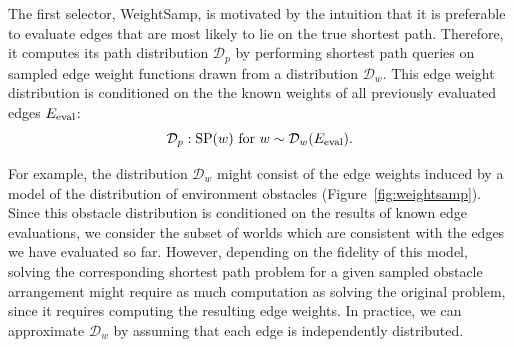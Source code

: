 \documentclass[nobib]{tufte-book}
\newcommand{\ms}[1]{\mbox{\scriptsize #1}}
\begin{document}
The first selector, WeightSamp,
is motivated by the intuition that it is preferable to evaluate edges
that are most likely to lie on the true shortest path.
Therefore,
it computes its path distribution $\mathcal{D}_p$
by performing shortest path queries
on sampled edge weight functions drawn from a distribution
$\mathcal{D}_w$.
This edge weight distribution is conditioned on the the known weights
of all previously evaluated edges $E_{\ms{eval}}$:
\begin{equation}
   \mathcal{D}_p : \mbox{SP}(w)
   \mbox{ for } w \sim \mathcal{D}_w(E_{\ms{eval}})
   \label{eqn:weightsamp}.
\end{equation}

For example,
the distribution $\mathcal{D}_w$ might consist of
the edge weights induced by a model of the distribution of
environment obstacles
(Figure~\ref{fig:weightsamp}).
Since this obstacle distribution is conditioned on the results
of known edge evaluations,
we consider the subset of worlds which are consistent
with the edges we have evaluated so far.
However,
depending on the fidelity of this model,
solving the corresponding shortest path problem for a given
sampled obstacle arrangement might require as much computation as
solving the original problem,
since it requires computing the resulting edge weights.
In practice,
we can approximate $\mathcal{D}_w$
by assuming that each edge is independently distributed.
\end{document}
